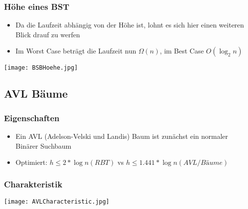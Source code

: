 		\vspace{2cm}
		\begin{minipage}[t]{0.5\textwidth}
			\subsubsection{Höhe eines BST}
				\begin{itemize}
					\item Da die Laufzeit abhängig von der Höhe ist, lohnt es sich hier einen weiteren Blick drauf 
					zu werfen
					\item Im Worst Case beträgt die Laufzeit nun $\Omega(n)$, im Best Case $O(\log_{2}n)$
			\end{itemize}
		\end{minipage}
		\begin{minipage}[t]{0.45\textwidth}
			\begin{center}
				\texttt{[image: BSBHoehe.jpg]}
			\end{center}
		\end{minipage}


	\newpage
	\subsection{AVL Bäume}
		\begin{minipage}{0.6\textwidth}
			\subsubsection{Eigenschaften}
				\begin{itemize}
					\item Ein AVL (Adelson-Velski und Landis) Baum ist zunächst ein normaler Binärer Suchbaum
					\item Optimiert: $h \leq 2*\log n (RBT)$ vs $h \leq 1.441 * \log n (AVL/Bäume)$
				\end{itemize}
		\end{minipage}
		\hspace{1cm}
		\begin{minipage}{0.3\textwidth}
				\begin{center}
			\subsubsection{Charakteristik}
					\texttt{[image: AVLCharacteristic.jpg]}
				\end{center}
		\end{minipage}

